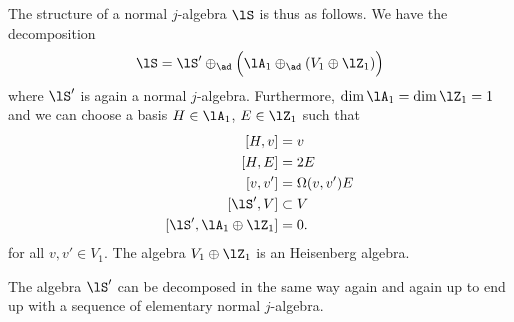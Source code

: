 The structure of a normal $j$-algebra $\lS$ is thus as follows. We have the decomposition
\begin{equation}
	\lS=\lS'\oplus_{\ad}\Big( \lA_1\oplus_{\ad}(V_1\oplus\lZ_1) \Big)
\end{equation}
where $\lS'$ is again a normal $j$-algebra. Furthermore, $\dim\lA_1=\dim\lZ_1=1$ and we can choose a basis $H\in\lA_1$, $E\in\lZ_1$ such that
\begin{equation}
	\begin{aligned}[]
		[H,v]                   & =v             \\
		[H,E]                   & =2E            \\
		[v,v']                  & =\Omega(v,v')E \\
		[\lS',V]                & \subset V      \\
		[\lS',\lA_1\oplus\lZ_1] & =0.
	\end{aligned}
\end{equation}
for all $v,v'\in V_1$. The algebra $V_1\oplus\lZ_1$ is an Heisenberg algebra.

The algebra $\lS'$ can be decomposed in the same way again and again up to end up with a sequence of elementary normal $j$-algebra.
